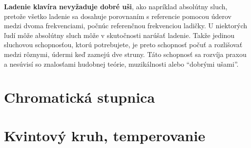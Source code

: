 \documentclass[11pt,a4paper]{book}
\begin{document}
\textbf{Ladenie klavíra nevyžaduje dobré uši}, ako napríklad absolútny sluch, pretože všetko ladenie sa dosahuje porovnaním s referencie pomocou úderov medzi dvoma frekvenciami, počnúc referenčnou frekvenciou ladičky. U niektorých ľudí môže absolútny sluch môže v skutočnosti narúšať ladenie. Takže jedinou sluchovou schopnosťou, ktorú potrebujete, je preto schopnosť počuť a rozlišovať medzi rôznymi, údermi keď zaznejú dve struny. Táto schopnosť sa rozvíja praxou a nesúvisí so znalosťami hudobnej teórie, muzikálnosti alebo “dobrými ušami”.

\section{Chromatická stupnica}\label{s:chromatic-scale}

\section{Kvintový kruh, temperovanie}\label{s:circle-fifths}

\newpage
%
\end{document}

